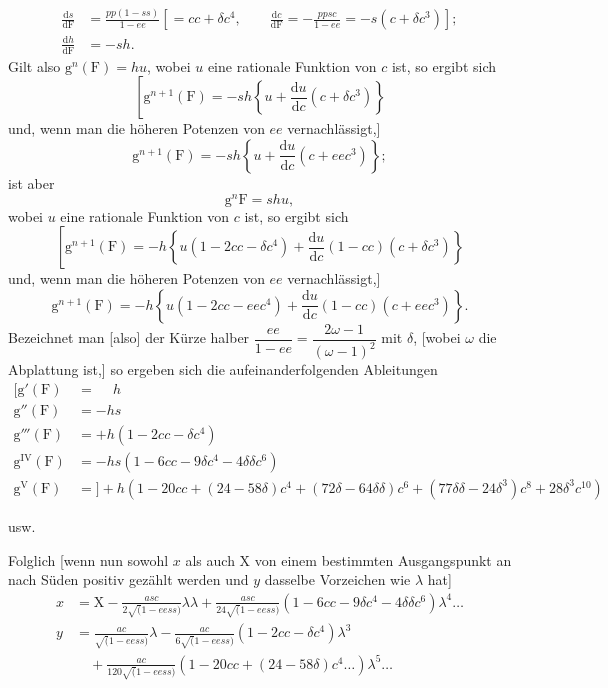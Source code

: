 \[
\begin{aligned}
\frac{\mathrm ds}{\mathrm d\mathrm F}
 &=\frac{pp(1-ss)}{1-ee}\left[=cc+\delta c^4,\qquad
 \frac{\mathrm dc}{\mathrm d\mathrm F}=-\frac{ppsc}{1-ee}=-s(c+\delta c^3)\right];\\
\frac{\mathrm dh}{\mathrm d\mathrm F}&=-sh.
\end{aligned}
\]
Gilt also \(\mathrm g^n(\mathrm F)=hu\), wobei \(u\) eine rationale Funktion von \(c\) ist, so ergibt sich
\[
\left[\mathrm g^{n+1}(\mathrm F)=-sh\left\{u+\frac{\mathrm du}{\mathrm dc}(c+\delta c^3)\right\}\right.
\]
\noindent und, wenn man die höheren Potenzen von \(ee\) vernachlässigt,]
\[
\mathrm g^{n+1}(\mathrm F)=-sh\left\{u+\frac{\mathrm du}{\mathrm dc}(c+eec^3)\right\};
\]
\noindent ist aber
\[
\mathrm g^n\mathrm F=shu,
\]
\noindent wobei \(u\) eine rationale Funktion von \(c\) ist, so ergibt sich
\[
\left[\mathrm g^{n+1}(\mathrm F)=-h\left\{u(1-2cc-\delta c^4)
 +\frac{\mathrm du}{\mathrm dc}(1-cc)(c+\delta c^3)\right\}\right.
\]
\noindent und, wenn man die höheren Potenzen von \(ee\) vernachlässigt,]
\[
\mathrm g^{n+1}(\mathrm F)=-h\left\{u(1-2cc-eec^4)
 +\frac{\mathrm du}{\mathrm dc}(1-cc)(c+eec^3)\right\}.
\]
Bezeichnet man [also] der Kürze halber
\(\dfrac{ee}{1-ee}=\dfrac{2\omega-1}{(\omega-1)^2}\) mit \(\delta\),
[wobei \(\omega\) die Abplattung ist,] so ergeben sich die aufeinanderfolgenden Ableitungen
\[
\begin{aligned}
\mathopen{[}\mathrm g'(\mathrm F)&=\phantom{+}h\\
\mathrm g''(\mathrm F)&=-hs\\
\mathrm g'''(\mathrm F)&=+h(1-2cc-\delta c^4)\\
\mathrm g^{\mathrm{IV}}(\mathrm F)&=-hs(1-6cc-9\delta c^4-4\delta\delta c^6)\\
\mathrm g^{\mathrm V}(\mathrm F)&={]}+h(1-20cc+(24-58\delta)c^4+(72\delta-64\delta\delta)c^6
 +(77\delta\delta-24\delta^3)c^8+28\delta^3c^{10})
\end{aligned}
\]
\centerline{usw.}
\medskip

Folglich [wenn nun sowohl \(x\) als auch \(\mathrm X\) von einem bestimmten Ausgangspunkt
an nach Süden positiv gezählt werden und \(y\) dasselbe Vorzeichen wie \(\lambda\) hat]
\[
\begin{aligned}
x&=\mathrm X-\frac{asc}{2\surd(1-eess)}\lambda\lambda
 +\frac{asc}{24\surd(1-eess)}(1-6cc-9\delta c^4-4\delta\delta c^6)\lambda^4\ldots\\
y&=\frac{ac}{\surd(1-eess)}\lambda
 -\frac{ac}{6\surd(1-eess)}(1-2cc-\delta c^4)\lambda^3\\
 &\quad+\frac{ac}{120\surd(1-eess)}(1-20cc+(24-58\delta)c^4\ldots)\lambda^5\ldots
\end{aligned}
\]

